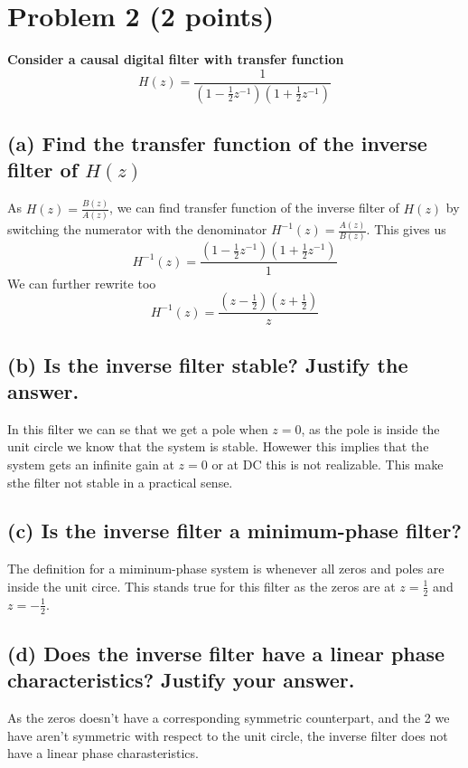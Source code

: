\section{Problem 2 (2 points)}
\textbf{Consider a causal digital filter with transfer function}
\[H(z)=\frac{1}{\left(1-\frac{1}{2} z^{-1}\right)\left(1+\frac{1}{2} z^{-1}\right)}\]
\subsection*{(a) Find the transfer function of the inverse filter of \( H(z) \)}
As $H(z)=\frac{B(z)}{A(z)}$, we can find transfer function of the inverse filter of \( H(z) \) by switching the numerator  with the denominator $H^{-1}(z)=\frac{A(z)}{B(z)}$. This gives us
\[H^{-1}(z)=\frac{\left(1-\frac{1}{2} z^{-1}\right)\left(1+\frac{1}{2} z^{-1}\right)}{1}\]
We can further rewrite too
\[H^{-1}(z)=\frac{\left(z-\frac{1}{2}\right)\left(z+\frac{1}{2}\right)}{z}\]
\subsection*{(b) Is the inverse filter stable? Justify the answer.}
In this filter we can se that we get a pole when $z=0$, as the pole is inside the unit circle we know that the system is stable. Howewer this implies that the system gets an infinite gain at $z=0$ or at DC this is not realizable. This make sthe filter not stable in a practical sense.
\subsection*{(c) Is the inverse filter a minimum-phase filter?}
The definition for a miminum-phase system is whenever all zeros and poles are inside the unit circe. This stands true for this filter as the zeros are at $z=\frac{1}{2}$ and $z=-\frac{1}{2}$.
\subsection*{(d) Does the inverse filter have a linear phase characteristics? Justify your answer.}

As the zeros doesn't have a corresponding symmetric counterpart, and the 2 we have aren't symmetric with respect to the unit circle, the inverse filter does not have a linear phase charasteristics.